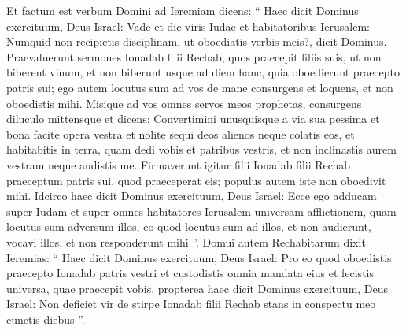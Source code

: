 \begin{biblechapter}
\begin{biblechapter}
\begin{biblechapter}
\begin{biblechapter}
\begin{biblechapter}
\begin{biblechapter}
\begin{biblechapter}
\begin{biblechapter}
\begin{biblechapter}
\begin{biblechapter}
\begin{biblechapter}
\begin{biblechapter}
\begin{biblechapter}
\begin{biblechapter}
\begin{biblechapter}
\begin{biblechapter}
\begin{biblechapter}
\begin{biblechapter}
\begin{biblechapter}
\begin{biblechapter}
\begin{biblechapter}
\begin{biblechapter}
\begin{biblechapter}
\begin{biblechapter}
\begin{biblechapter}
\begin{biblechapter}
\begin{biblechapter}
\begin{biblechapter}
\begin{biblechapter}
\begin{biblechapter}
\begin{biblechapter}
\begin{biblechapter}
\begin{biblechapter}
\begin{biblechapter}
\begin{biblechapter}
 \verse Et factum est verbum Domini ad Ieremiam dicens: 
\verse “ Haec dicit Dominus exercituum, Deus Israel: Vade et dic viris Iudae et habitatoribus Ierusalem: Numquid non recipietis disciplinam, ut oboediatis verbis meis?, dicit Dominus. 
\verse Praevaluerunt sermones Ionadab filii Rechab, quos praecepit filiis suis, ut non biberent vinum, et non biberunt usque ad diem hanc, quia oboedierunt praecepto patris sui; ego autem locutus sum ad vos de mane consurgens et loquens, et non oboedistis mihi. 
\verse Misique ad vos omnes servos meos prophetas, consurgens diluculo mittensque et dicens: Convertimini unusquisque a via sua pessima et bona facite opera vestra et nolite sequi deos alienos neque colatis eos, et habitabitis in terra, quam dedi vobis et patribus vestris, et non inclinastis aurem vestram neque audistis me. 
\verse Firmaverunt igitur filii Ionadab filii Rechab praeceptum patris sui, quod praeceperat eis; populus autem iste non oboedivit mihi. 
\verse Idcirco haec dicit Dominus exercituum, Deus Israel: Ecce ego adducam super Iudam et super omnes habitatores Ierusalem universam afflictionem, quam locutus sum adversum illos, eo quod locutus sum ad illos, et non audierunt, vocavi illos, et non responderunt mihi ”.
 \verse Domui autem Rechabitarum dixit Ieremias: “ Haec dicit Dominus exercituum, Deus Israel: Pro eo quod oboedistis praecepto Ionadab patris vestri et custodistis omnia mandata eius et fecistis universa, quae praecepit vobis, 
 \verse propterea haec dicit Dominus exercituum, Deus Israel: Non deficiet vir de stirpe Ionadab filii Rechab stans in conspectu meo cunctis diebus ”.
 

\end{biblechapter}
\end{biblechapter}
\end{biblechapter}
\end{biblechapter}
\end{biblechapter}
\end{biblechapter}
\end{biblechapter}
\end{biblechapter}
\end{biblechapter}
\end{biblechapter}
\end{biblechapter}
\end{biblechapter}
\end{biblechapter}
\end{biblechapter}
\end{biblechapter}
\end{biblechapter}
\end{biblechapter}
\end{biblechapter}
\end{biblechapter}
\end{biblechapter}
\end{biblechapter}
\end{biblechapter}
\end{biblechapter}
\end{biblechapter}
\end{biblechapter}
\end{biblechapter}
\end{biblechapter}
\end{biblechapter}
\end{biblechapter}
\end{biblechapter}
\end{biblechapter}
\end{biblechapter}
\end{biblechapter}
\end{biblechapter}
\end{biblechapter}
